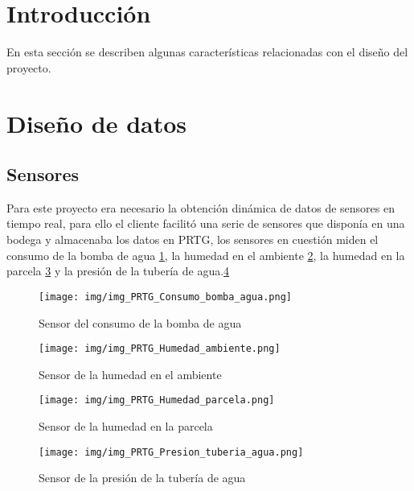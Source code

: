 
\section{Introducción}
En esta sección se describen algunas características relacionadas con el diseño del proyecto.

\section{Diseño de datos}

\subsection{Sensores}
Para este proyecto era necesario la obtención dinámica de datos de sensores en tiempo real, para ello el cliente facilitó una serie de sensores que disponía en una bodega y almacenaba los datos en PRTG, los sensores en cuestión miden el consumo de la bomba de agua \ref{img_Consumo_Bomba_Agua}, la humedad en el ambiente \ref{mg_Humedad_Ambiente_PRTG}, la humedad en la parcela \ref{img_Humedad_Parcela_PRTG} y la presión de la tubería de agua.\ref{img_Presion_Tuberia_Agua_PRTG}



\begin{figure}[!h]
	\centering
	\texttt{[image: img/img\_PRTG\_Consumo\_bomba\_agua.png]}
	\caption{Sensor del consumo de la bomba de agua}
	\label{img_Consumo_Bomba_Agua}
\end{figure}

\begin{figure}[!h]
	\centering
	\texttt{[image: img/img\_PRTG\_Humedad\_ambiente.png]}
	\caption{Sensor de la humedad en el ambiente}
	\label{mg_Humedad_Ambiente_PRTG}
\end{figure}

\begin{figure}[!h]
	\centering
	\texttt{[image: img/img\_PRTG\_Humedad\_parcela.png]}
	\caption{Sensor de la humedad en la parcela}
	\label{img_Humedad_Parcela_PRTG}
\end{figure}

\begin{figure}[!h]
	\centering
	\texttt{[image: img/img\_PRTG\_Presion\_tuberia\_agua.png]}
	\caption{Sensor de la presión de la tubería de agua}
	\label{img_Presion_Tuberia_Agua_PRTG}
\end{figure}

